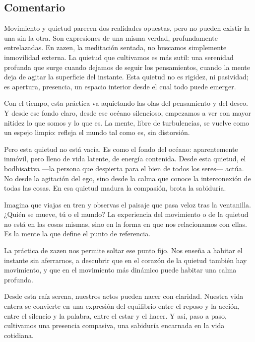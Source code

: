 \documentclass[
  a5paperpaper,
]{article}
\begin{document}
\hfill\break

\hypertarget{comentario-51}{%
\subsection{Comentario}\label{comentario-51}}

Movimiento y quietud parecen dos realidades opuestas, pero no pueden
existir la una sin la otra. Son expresiones de una misma verdad,
profundamente entrelazadas. En zazen, la meditación sentada, no buscamos
simplemente inmovilidad externa. La quietud que cultivamos es más sutil:
una serenidad profunda que surge cuando dejamos de seguir los
pensamientos, cuando la mente deja de agitar la superficie del instante.
Esta quietud no es rigidez, ni pasividad; es apertura, presencia, un
espacio interior desde el cual todo puede emerger.

Con el tiempo, esta práctica va aquietando las olas del pensamiento y
del deseo. Y desde ese fondo claro, desde ese océano silencioso,
empezamos a ver con mayor nitidez lo que somos y lo que es. La mente,
libre de turbulencias, se vuelve como un espejo limpio: refleja el mundo
tal como es, sin distorsión.

Pero esta quietud no está vacía. Es como el fondo del océano:
aparentemente inmóvil, pero lleno de vida latente, de energía contenida.
Desde esta quietud, el bodhisattva ---la persona que despierta para el
bien de todos los seres--- actúa. No desde la agitación del ego, sino
desde la calma que conoce la interconexión de todas las cosas. En esa
quietud madura la compasión, brota la sabiduría.

Imagina que viajas en tren y observas el paisaje que pasa veloz tras la
ventanilla. ¿Quién se mueve, tú o el mundo? La experiencia del
movimiento o de la quietud no está en las cosas mismas, sino en la forma
en que nos relacionamos con ellas. Es la mente la que define el punto de
referencia.

La práctica de zazen nos permite soltar ese punto fijo. Nos enseña a
habitar el instante sin aferrarnos, a descubrir que en el corazón de la
quietud también hay movimiento, y que en el movimiento más dinámico
puede habitar una calma profunda.

Desde esta raíz serena, nuestros actos pueden nacer con claridad.
Nuestra vida entera se convierte en una expresión del equilibrio entre
el reposo y la acción, entre el silencio y la palabra, entre el estar y
el hacer. Y así, paso a paso, cultivamos una presencia compasiva, una
sabiduría encarnada en la vida cotidiana.
\end{document}
